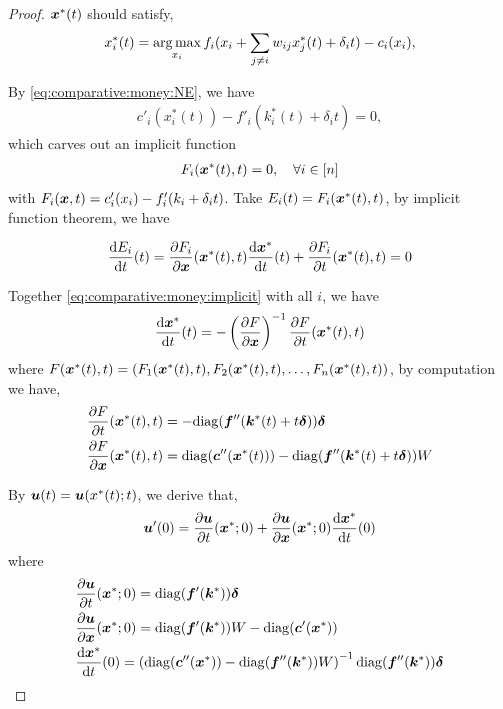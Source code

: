 \begin{proof}
\label{prf:thm:comparative:money}
${\bm{x}}^*(t)$ should satisfy,
\begin{equation}
\label{eq:comparative:money:NE}
    x^*_i(t) = \operatorname*{arg\,max}_{x_i} f_i(x_i + \sum_{j\ne i} w_{ij} x^*_j(t) + \delta_i t) - c_i(x_i),
\end{equation}

By \cref{eq:comparative:money:NE}, we have
\begin{align*}
    c'_i(x^*_i(t)) - f'_i(k^*_i(t) + \delta_i t) = 0,
\end{align*}
which carves out an implicit function
\begin{align*}
    F_i({\bm{x}}^*(t), t) = 0,\quad \forall {i\in[n]}
\end{align*}
with $F_i({\bm{x}},t) = c'_i(x_i) - f'_i(k_i + \delta_i t)$. Take $E_i(t) = F_i({\bm{x}}^*(t), t)$, by implicit function theorem, we have

\begin{equation}
\label{eq:comparative:money:implicit}
    \frac{\mathrm{d} E_i}{\mathrm{d} t}(t) = \frac{\partial F_i}{\partial {\bm{x}}}({\bm{x}}^*(t),t) \frac{\mathrm{d} {\bm{x}}^*}{\mathrm{d} t}(t) + \frac{\partial F_i}{\partial t}({\bm{x}}^*(t),t) = 0
\end{equation}

Together \cref{eq:comparative:money:implicit} with all $i$, we have 
\begin{align*}
    \frac{\mathrm{d} {\bm{x}}^*}{\mathrm{d} t}(t) = - \left( \frac{\partial F}{\partial {\bm{x}}} \right)^{-1} \frac{\partial F}{\partial t}({\bm{x}}^*(t),t)
\end{align*}
where $F({\bm{x}}^*(t),t) = (F_1({\bm{x}}^*(t),t), F_2({\bm{x}}^*(t),t), \dots, F_n({\bm{x}}^*(t),t))$, by computation we have,
\begin{align*}
    & \frac{\partial F}{\partial t}({\bm{x}}^*(t),t) = -\mathrm{diag}({\bm{f}}''({\bm{k}}^*(t) + t\bm{\delta})) \bm{\delta}
    \\
    & \frac{\partial F}{\partial {\bm{x}}}({\bm{x}}^*(t),t) = \mathrm{diag}({\bm{c}}''({\bm{x}}^*(t))) - \mathrm{diag}({\bm{f}}''({\bm{k}}^*(t) + t\bm{\delta}))W
\end{align*}

By ${\bm{u}}(t) = {\bm{u}}(x^*(t);t)$, we derive that,
\begin{align*}
    {\bm{u}}'(0) = \frac{\partial {\bm{u}}}{\partial t}({\bm{x}}^*;0) + \frac{\partial {\bm{u}}}{\partial {\bm{x}}}({\bm{x}}^*;0) \frac{\mathrm{d} {\bm{x}}^*}{\mathrm{d} t}(0)
\end{align*}
where
\begin{align*}
    & \frac{\partial {\bm{u}}}{\partial t}({\bm{x}}^*;0) = \mathrm{diag}({\bm{f}}'({\bm{k}}^*)) \bm{\delta}
    \\
    & \frac{\partial {\bm{u}}}{\partial {\bm{x}}}({\bm{x}}^*;0) = \mathrm{diag}({\bm{f}}'({\bm{k}}^*)) W - \mathrm{diag}({\bm{c}}'({\bm{x}}^*))
    \\
    & \frac{\mathrm{d} {\bm{x}}^*}{\mathrm{d} t}(0) = \left( \mathrm{diag}({\bm{c}}''({\bm{x}}^*)) - \mathrm{diag}({\bm{f}}''({\bm{k}}^*))W \right)^{-1} \mathrm{diag}({\bm{f}}''({\bm{k}}^*)) \bm{\delta}
\end{align*}


\end{proof}
